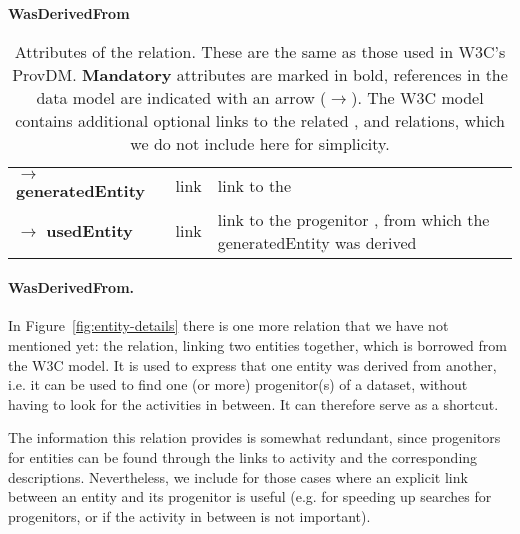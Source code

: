 \begin{table}[h]

\small
{}\textwidth

\textbf{\normalsize WasDerivedFrom}\vspace{0.25em}\\
\begin{tabulary}{1.0\textwidth}{@{}lp{3cm}L@{}}
\toprule
{} &    & \\
\midrule
$\rightarrow$ \textbf{generatedEntity} & link      & link to the \\
$\rightarrow$ \textbf{usedEntity}      & link      & link to the progenitor , from which the generatedEntity was derived\\
\bottomrule
\end{tabulary}
\caption[Attributes of the  relation]{Attributes of the
 relation. These are the same as those used in W3C's
ProvDM. \textbf{Mandatory} attributes are marked in bold, references in the data
model are indicated with an arrow ($\rightarrow$). The W3C model contains
additional optional links to the related ,
 and  relations, which we do not include here for simplicity.
}\label{tab:wasderivedfrom-attributes}
\end{table}


\paragraph{WasDerivedFrom.}
In Figure~\ref{fig:entity-details} there is one more relation that we have not
mentioned yet: the  relation, linking two entities
together, which is borrowed from the W3C model. It is used to express that one
entity was derived from another, i.e. it can be used to find one (or more)
progenitor(s) of a dataset, without having to look for the activities in
between. It can therefore serve as a shortcut.

The information this relation provides is somewhat redundant, since progenitors
for entities can be found through the links to activity and the corresponding
descriptions. Nevertheless, we include  for those cases
where an explicit  link between an entity and its progenitor is useful (e.g. for
speeding up searches for  progenitors, or if the activity in between is not
important).

